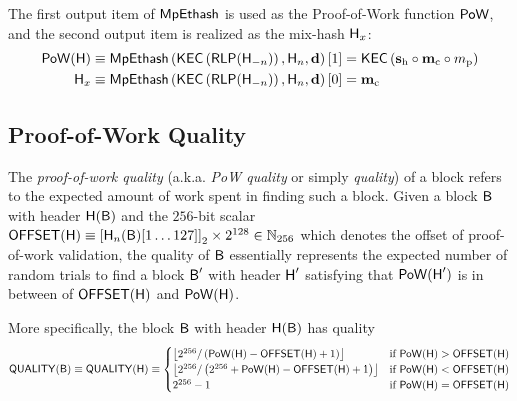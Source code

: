 The first output item of $\mathsf{MpEthash}$ is used as the Proof-of-Work function $\mathsf{PoW}$, 
and the second output item is realized as the mix-hash $\textsf{H}_x$:
\begin{align}\label{eq:pow}
	\mathsf{PoW}(\textsf{H}) 
	&\equiv \mathsf{MpEthash}\left(\mathsf{KEC}\left(\mathsf{RLP}( \textsf{H}_{-n} )\right), \textsf{H}_{n},\mathbf{d}\right)[1] 
	= \mathsf{KEC}\left(\mathbf{s}_{\mathrm{h}} \circ \mathbf{m}_{\mathrm{c}} \circ {m}_{\mathrm{p}}\right)\\
	\textsf{H}_x 
	&\equiv \mathsf{MpEthash}\left(\mathsf{KEC}\left(\mathsf{RLP}( \textsf{H}_{-n} )\right), \textsf{H}_{n},\mathbf{d}\right)[0] 
	= \mathbf{m}_{\mathrm{c}} \label{eq:mixhash}
\end{align}






\subsection{Proof-of-Work Quality}
\label{subsec:quality}

The \emph{proof-of-work quality} (a.k.a. \emph{PoW quality} or simply \emph{quality}) of a block refers to the expected amount of work spent in finding such a block.
Given a block $\textsf{B}$ with header $\textsf{H}(\textsf{B})$ and 
the $256$-bit scalar $\mathsf{OFFSET}(\textsf{H}) \equiv \left[\textsf{H}_n(\textsf{B})[1\dots127]\right]_2\times 2^{128} \in \mathbb{N}_{256}$ which denotes the offset of proof-of-work validation,
the quality of $\textsf{B}$ essentially represents the expected number of random trials to find a block $\textsf{B}'$ with header $\textsf{H}'$ satisfying that $\mathsf{PoW}(\textsf{H}')$ is in between of $\mathsf{OFFSET}(\textsf{H})$ and $\mathsf{PoW}(\textsf{H})$.

More specifically, the block $\textsf{B}$ with header $\textsf{H}(\textsf{B})$ has quality
\begin{align}
	\mathsf{QUALITY}(\textsf{B})\equiv 
	\mathsf{QUALITY}(\textsf{H}) \equiv
	\begin{cases}
		\left\lfloor2^{256}/\left(\mathsf{PoW}(\textsf{H}) - \mathsf{OFFSET}(\textsf{H}) +1 \right) \right\rfloor 
		& \mbox{if $\mathsf{PoW}(\textsf{H}) > \mathsf{OFFSET}(\textsf{H})$}\\
		\left\lfloor2^{256}/\left(2^{256}+\mathsf{PoW}(\textsf{H}) - \mathsf{OFFSET}(\textsf{H}) +1 \right) \right\rfloor 
		& \mbox{if $\mathsf{PoW}(\textsf{H}) < \mathsf{OFFSET}(\textsf{H})$}\\
		2^{256}-1 &  \mbox{if $\mathsf{PoW}(\textsf{H}) = \mathsf{OFFSET}(\textsf{H})$}
	\end{cases}
\end{align}


